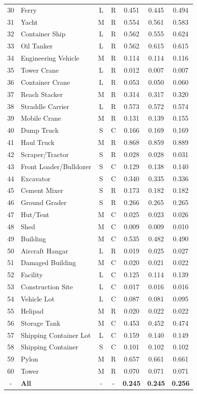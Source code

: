 \begin{center}
\begin{longtable}{|c|l|c|c|c|c|c|}
30 & Ferry & L & R & 0.451 & 0.445 & 0.494\\
31 & Yacht & M & R & 0.554 & 0.561 & 0.583\\
32 & Container Ship & L & R & 0.562 & 0.555 & 0.624\\
33 & Oil Tanker & L & R & 0.562 & 0.615 & 0.615\\
34 & Engineering Vehicle & M & R & 0.114 & 0.114 & 0.116\\
35 & Tower Crane & L & R & 0.012 & 0.007 & 0.007\\
36 & Container Crane & L & R & 0.053 & 0.050 & 0.060\\
37 & Reach Stacker & M & R & 0.314 & 0.317 & 0.320\\
38 & Straddle Carrier & L & R & 0.573 & 0.572 & 0.574\\
39 & Mobile Crane & M & R & 0.131 & 0.139 & 0.155\\
40 & Dump Truck & S & C & 0.166 & 0.169 & 0.169\\
41 & Haul Truck & M & R & 0.868 & 0.859 & 0.889\\
42 & Scraper/Tractor & S & R & 0.028 & 0.028 & 0.031\\
43 & Front Loader/Bulldozer & S & C & 0.129 & 0.138 & 0.140\\
44 & Excavator & S & C & 0.340 & 0.335 & 0.336\\
45 & Cement Mixer & S & R & 0.173 & 0.182 & 0.182\\
46 & Ground Grader & S & R & 0.266 & 0.265 & 0.265\\
47 & Hut/Tent & M & C & 0.025 & 0.023 & 0.026\\
48 & Shed & M & C & 0.009 & 0.009 & 0.010\\
49 & Building & M & C & 0.535 & 0.482 & 0.490\\
50 & Aircraft Hangar & L & R & 0.019 & 0.025 & 0.027\\
51 & Damaged Building & M & C & 0.020 & 0.021 & 0.022\\
52 & Facility & L & C & 0.125 & 0.114 & 0.139\\
53 & Construction Site & L & C & 0.017 & 0.016 & 0.016\\
54 & Vehicle Lot & L & C & 0.087 & 0.081 & 0.095\\
55 & Helipad & M & R & 0.020 & 0.022 & 0.022\\
56 & Storage Tank & M & C & 0.453 & 0.452 & 0.474\\
57 & Shipping Container Lot & L & C & 0.159 & 0.140 & 0.149\\
58 & Shipping Container & S & C & 0.101 & 0.102 & 0.102\\
59 & Pylon & M & R & 0.657 & 0.661 & 0.661\\
60 & Tower & M & R & 0.070 & 0.071 & 0.071\\
- & \textbf{All} & - & - & \textbf{0.245} & \textbf{0.245} & \textbf{0.256}\\
\end{longtable}
\end{center}

